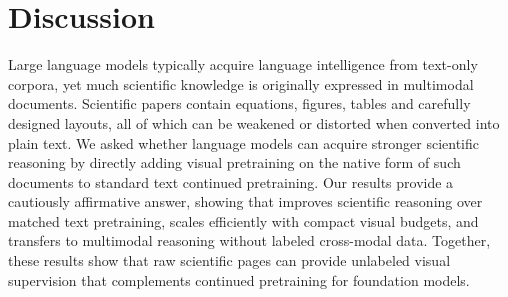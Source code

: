 \section{Discussion}
\label{sec:discussion}
Large language models typically acquire language intelligence from text-only corpora, 
yet much scientific knowledge is originally expressed in multimodal documents. 
Scientific papers contain equations, figures, tables and carefully designed layouts, 
all of which can be weakened or distorted when converted into plain text. 
We asked whether language models can acquire stronger scientific reasoning by directly adding visual pretraining on the native form of such documents to standard text continued pretraining.
Our results provide a cautiously affirmative answer, showing that \methodname improves scientific reasoning over matched text pretraining, 
scales efficiently with compact visual budgets, and transfers to multimodal reasoning without labeled cross-modal data. 
Together, these results show that raw scientific pages can provide unlabeled visual supervision that complements continued pretraining for foundation models.
